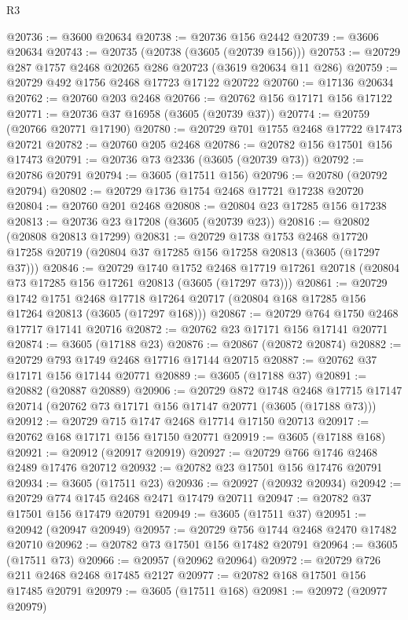 \begin{lexlean}{R3}
\begin{coremodule}
@20736 := @3600 @20634
@20738 := @20736 @156 @2442
@20739 := @3606 @20634
@20743 := @20735 (@20738 (@3605 (@20739 @156)))
@20753 := @20729 @287 @1757 @2468 @20265 @286 @20723 (@3619 @20634 @11 @286)
@20759 := @20729 @492 @1756 @2468 @17723 @17122 @20722
@20760 := @17136 @20634
@20762 := @20760 @203 @2468
@20766 := @20762 @156 @17171 @156 @17122
@20771 := @20736 @37 @16958 (@3605 (@20739 @37))
@20774 := @20759 (@20766 @20771 @17190)
@20780 := @20729 @701 @1755 @2468 @17722 @17473 @20721
@20782 := @20760 @205 @2468
@20786 := @20782 @156 @17501 @156 @17473
@20791 := @20736 @73 @2336 (@3605 (@20739 @73))
@20792 := @20786 @20791
@20794 := @3605 (@17511 @156)
@20796 := @20780 (@20792 @20794)
@20802 := @20729 @1736 @1754 @2468 @17721 @17238 @20720
@20804 := @20760 @201 @2468
@20808 := @20804 @23 @17285 @156 @17238
@20813 := @20736 @23 @17208 (@3605 (@20739 @23))
@20816 := @20802 (@20808 @20813 @17299)
@20831 := @20729
    @1738
    @1753
    @2468
    @17720
    @17258
    @20719
    (@20804 @37 @17285 @156 @17258 @20813 (@3605 (@17297 @37)))
@20846 := @20729
    @1740
    @1752
    @2468
    @17719
    @17261
    @20718
    (@20804 @73 @17285 @156 @17261 @20813 (@3605 (@17297 @73)))
@20861 := @20729
    @1742
    @1751
    @2468
    @17718
    @17264
    @20717
    (@20804 @168 @17285 @156 @17264 @20813 (@3605 (@17297 @168)))
@20867 := @20729 @764 @1750 @2468 @17717 @17141 @20716
@20872 := @20762 @23 @17171 @156 @17141 @20771
@20874 := @3605 (@17188 @23)
@20876 := @20867 (@20872 @20874)
@20882 := @20729 @793 @1749 @2468 @17716 @17144 @20715
@20887 := @20762 @37 @17171 @156 @17144 @20771
@20889 := @3605 (@17188 @37)
@20891 := @20882 (@20887 @20889)
@20906 := @20729
    @872
    @1748
    @2468
    @17715
    @17147
    @20714
    (@20762 @73 @17171 @156 @17147 @20771 (@3605 (@17188 @73)))
@20912 := @20729 @715 @1747 @2468 @17714 @17150 @20713
@20917 := @20762 @168 @17171 @156 @17150 @20771
@20919 := @3605 (@17188 @168)
@20921 := @20912 (@20917 @20919)
@20927 := @20729 @766 @1746 @2468 @2489 @17476 @20712
@20932 := @20782 @23 @17501 @156 @17476 @20791
@20934 := @3605 (@17511 @23)
@20936 := @20927 (@20932 @20934)
@20942 := @20729 @774 @1745 @2468 @2471 @17479 @20711
@20947 := @20782 @37 @17501 @156 @17479 @20791
@20949 := @3605 (@17511 @37)
@20951 := @20942 (@20947 @20949)
@20957 := @20729 @756 @1744 @2468 @2470 @17482 @20710
@20962 := @20782 @73 @17501 @156 @17482 @20791
@20964 := @3605 (@17511 @73)
@20966 := @20957 (@20962 @20964)
@20972 := @20729 @726 @211 @2468 @2468 @17485 @2127
@20977 := @20782 @168 @17501 @156 @17485 @20791
@20979 := @3605 (@17511 @168)
@20981 := @20972 (@20977 @20979)

\end{coremodule}
\end{lexlean}
